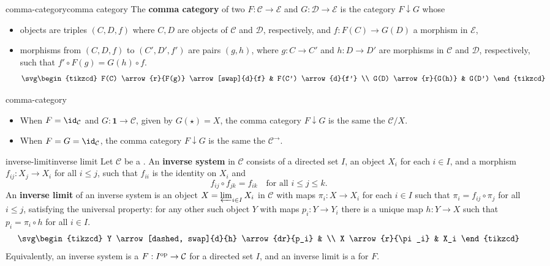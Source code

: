 \begin{topic}{comma-category}{comma category}
    The \textbf{comma category} of two  $F : \mathcal{C} \to \mathcal{E}$ and $G : \mathcal{D} \to \mathcal{E}$ is the category $F \downarrow G$ whose
    \begin{itemize}
        \item objects are triples $(C, D, f)$ where $C, D$ are objects of $\mathcal{C}$ and $\mathcal{D}$, respectively, and $f : F(C) \to G(D)$ a morphism in $\mathcal{E}$,
        \item morphisms from $(C, D, f)$ to $(C', D', f')$ are pairs $(g, h)$, where $g : C \to C'$ and $h : D \to D'$ are morphisms in $\mathcal{C}$ and $\mathcal{D}$, respectively, such that $f' \circ F(g) = G(h) \circ f$.
        \[ \svg \begin{tikzcd}
            F(C) \arrow{r}{F(g)} \arrow[swap]{d}{f} & F(C') \arrow{d}{f'} \\ G(D) \arrow{r}{G(h)} & G(D')
        \end{tikzcd} \]
    \end{itemize}
\end{topic}

\begin{example}{comma-category}
    \begin{itemize}
        \item When $F = \id_\mathcal{C}$ and $G : \textbf{1} \to \mathcal{C}$, given by $G(\star) = X$, the comma category $F \downarrow G$ is the same the  $\mathcal{C}/X$.
        \item When $F = G = \id_\mathcal{C}$, the comma category $F \downarrow G$ is the same the  $\mathcal{C}^\rightarrow$.
    \end{itemize}
\end{example}

\begin{topic}{inverse-limit}{inverse limit}
    Let $\mathcal{C}$ be a . An \textbf{inverse system} in $\mathcal{C}$ consists of a directed set $I$, an object $X_i$ for each $i \in I$, and a morphism $f_{ij} : X_j \to X_i$ for all $i \le j$, such that $f_{ii}$ is the identity on $X_i$ and
    \[ f_{ij} \circ f_{jk} = f_{ik} \quad \text{for all } i \le j \le k . \]
    An \textbf{inverse limit} of an inverse system is an object $X = \varprojlim_{i \in I} X_i$ in $\mathcal{C}$ with maps $\pi_i : X \to X_i$ for each $i \in I$ such that $\pi_i = f_{ij} \circ \pi_j$ for all $i \le j$, satisfying the universal property: for any other such object $Y$ with maps $p_i : Y \to Y_i$ there is a unique map $h : Y \to X$ such that $p_i = \pi_i \circ h$ for all $i \in I$.
    \[ \svg \begin{tikzcd} Y \arrow[dashed, swap]{d}{h} \arrow{dr}{p_i} & \\ X \arrow{r}{\pi_i} & X_i \end{tikzcd} \]
    Equivalently, an inverse system is a  $F : I^\textup{op} \to \mathcal{C}$ for a directed set $I$, and an inverse limit is a  for $F$.
\end{topic}

